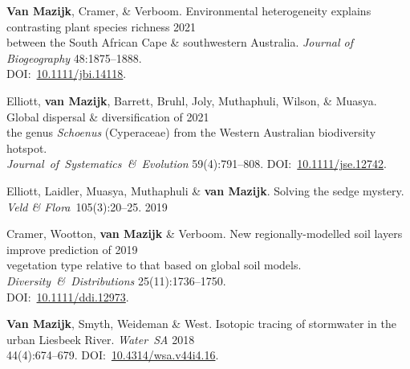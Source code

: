 \begin{hangparas}{2em}{1}

\textbf{Van Mazijk}, Cramer, \& Verboom.
Environmental heterogeneity explains contrasting plant species richness
                                                                  \hfill 2021 \\
  \hspace{2em} between the South African Cape \& southwestern Australia.
    \textit{Journal of Biogeography}
    48:1875--1888.                                                              \\
  \hspace{2em} DOI:~\href{https://doi.org/10.1111/jbi.14118}{10.1111/jbi.14118}.

Elliott, \textbf{van Mazijk}, Barrett, Bruhl,
  Joly, Muthaphuli, Wilson, \& Muasya.
Global dispersal \& diversification of                            \hfill 2021 \\
  \hspace{2em} the genus \textit{Schoenus} (Cyperaceae)
    from the Western Australian biodiversity hotspot.                         \\
  \hspace{2em} \textit{Journal~of~Systematics~\&~Evolution}
    59(4):791--808.
    DOI:~\href{https://doi.org/10.1111/jse.1274}{10.1111/jse.12742}.

Elliott, Laidler, Muasya, Muthaphuli \& \textbf{van Mazijk}.
Solving the sedge mystery.
\textit{Veld \& Flora}~105(3):20--25.                             \hfill 2019

Cramer, Wootton, \textbf{van Mazijk} \& Verboom.
New regionally-modelled soil layers improve prediction of         \hfill 2019 \\
  \hspace{2em} vegetation type relative to that based on global soil models.
    \textit{Diversity~\&~Distributions}
    25(11):1736--1750.                    \\
  \hspace{2em} DOI:~\href{https://doi.org/10.1111/ddi.12973}{10.1111/ddi.12973}.

\textbf{Van Mazijk}, Smyth, Weideman \& West.
Isotopic tracing of stormwater in the urban Liesbeek River.
\textit{Water~SA}                                                 \hfill 2018 \\
  \hspace{2em} 44(4):674--679.
    DOI:~\href{https://doi.org/10.4314/wsa.v44i4.16}{10.4314/wsa.v44i4.16}.

\end{hangparas}
